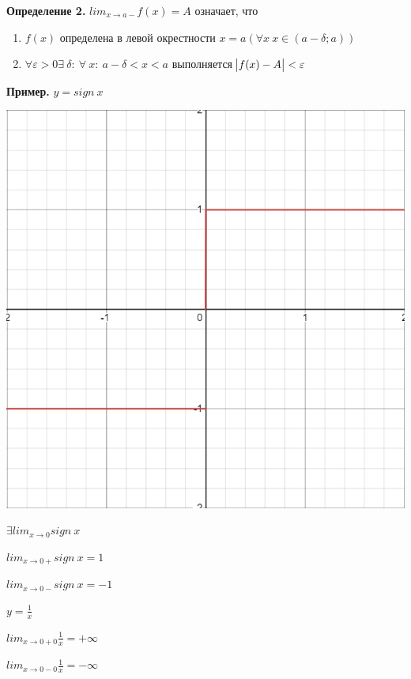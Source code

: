 \documentclass{article}
\begin{document}
  \textbf{Определение 2.} \( lim_{x \rightarrow a-} f(x) = A \) означает, что
  \begin{enumerate}
    \item \(f(x)\) определена в левой окрестности \(x=a(\forall x\ x \in (a-\delta; a))\)
    \item \( \forall \varepsilon > 0 \exists\ \delta:\ \forall\ x:\ a - \delta < x < a \) выполняется \( \abs{f(x) - A} < \varepsilon \)
     \end{enumerate}

  \textbf{Пример.} \(y = sign\ x\)

  \includegraphics[scale=0.35]{11_1_2_1.png}
  
  \( \exists lim_{x \rightarrow 0} sign\ x \)

  \( lim_{x \rightarrow 0+} sign\ x = 1 \)

  \( lim_{x \rightarrow 0-} sign\ x = -1\)

  \( y = \frac{1}{x} \)

  \(lim_{x \rightarrow 0+0} \frac{1}{x} = +\infty\)

  \(lim_{x \rightarrow 0-0} \frac{1}{x} = -\infty\)
 
\end{document}
